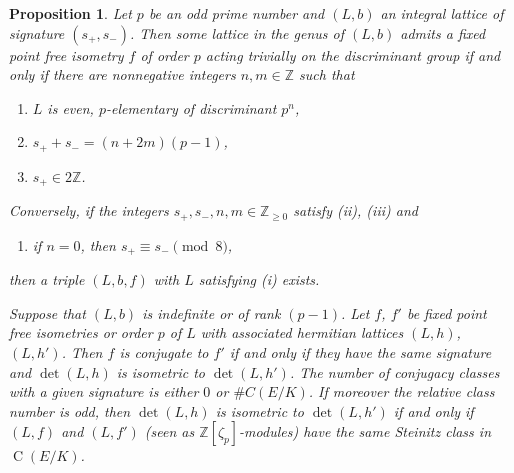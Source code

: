 \documentclass{amsart}
\theoremstyle{definition}
\theoremstyle{plain}
\newtheorem{proposition}[definition]{Proposition}
\DeclareMathOperator{\Cl}{C}
\newcommand{\ZZ}{\mathbb{Z}}
\begin{document}
\begin{proposition}\label{prop:clas-fixed-pt-free}
	Let $p$ be an odd prime number and $(L,b)$ an integral lattice
	of signature $(s_+,s_-)$.
	Then some lattice in the genus of $(L,b)$ admits a fixed point
	free isometry $f$
	of order $p$ acting trivially on the
	discriminant group if and only if
	there are nonnegative integers $n,m \in \ZZ$ such that
	\begin{enumerate}
		\item[(i)]  $L$ is even, $p$-elementary of discriminant $p^n$,
		\item[(ii)] $s_+ + s_- = (n + 2m)(p-1)$,
		\item[(iii)] $s_+ \in 2\ZZ$.
	\end{enumerate}
	 Conversely, if the integers $s_+,s_-,n,m \in \ZZ_{\geq 0}$ satisfy \emph{(ii)}, \emph{(iii)} and
	 \begin{enumerate}
		\item[(iv)] if $n=0$, then $s_+ \equiv s_- \pmod{8}$,	  \end{enumerate}
	 then a triple $(L,b,f)$ with $L$ satisfying \emph{(i)} exists.

    Suppose that $(L,b)$ is indefinite or of rank $(p-1)$.
    Let $f$, $f'$ be fixed point free isometries or order $p$ of $L$ with associated hermitian lattices $(L,h)$, $(L,h')$. Then $f$ is conjugate to $f'$ if and only if they have the same signature and $\det(L,h)$ is isometric to $\det(L,h')$.
    The number of conjugacy classes with a given signature is either $0$ or $\#C(E/K)$.
    If moreover the relative class number is odd, then $\det(L,h)$ is isometric to $\det(L,h')$ if and only if $(L,f)$ and $(L,f')$ (seen as $\ZZ[\zeta_p]$-modules) have the same Steinitz class in $\Cl(E/K)$.
\end{proposition}
\end{document}
